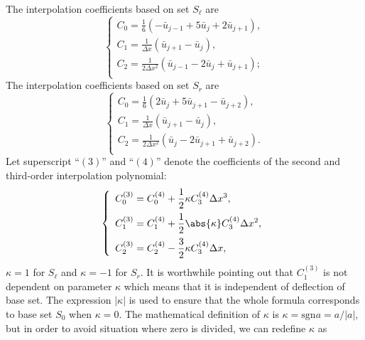 \documentclass[]{article}
\begin{document}
The interpolation coefficients based on set 
$S_\ell$ are
\begin{equation*}
    \left\{\begin{array}{l}
	\displaystyle
	C_0 = \frac{1}{6}(-\bar u_{j-1}+5\bar u_j+2\bar u_{j+1}),\\[3mm]
	\displaystyle
	C_1= \frac{1}{\Delta x}(\bar u_{j+1}-\bar u_{j}),\\[3mm]
	\displaystyle
	C_2 = \frac{1}{2\Delta x^2}(\bar u_{j-1}-2\bar u_j+\bar u_{j+1});\\[3mm]
    \end{array}\right.
\end{equation*}
The interpolation coefficients based on set $S_r$ are
\begin{equation*}
    \left\{\begin{array}{l}
	\displaystyle
	C_0 = \frac{1}{6}(2\bar u_{j}+5\bar u_{j+1}-\bar u_{j+2}),\\[3mm]
	\displaystyle
	C_1= \frac{1}{\Delta x}(\bar u_{j+1}-\bar u_{j}),\\[3mm]
	\displaystyle
	C_2 = \frac{1}{2\Delta x^2}(\bar u_{j}-2\bar u_{j+1}+\bar u_{j+2}).\\[3mm]
    \end{array}\right.
\end{equation*}
Let superscript ``$(3)$'' and ``$(4)$'' denote the coefficients of the second
and third-order interpolation polynomial:
\begin{equation}
    \left\{\begin{array}{l}
	\displaystyle
	C_0^{(3)}=C_0^{(4)}+\frac{1}{2}\kappa C_3^{(4)}\Delta x^3, \\[3mm]
	\displaystyle
	C_1^{(3)}=C_1^{(4)}+\frac{1}{2}\abs{\kappa} C_3^{(4)}\Delta x^2, \\[3mm]
	\displaystyle
	C_2^{(3)}=C_2^{(4)}-\frac{3}{2}\kappa C_3^{(4)}\Delta x, \\
    \end{array}\right.
    \label{eq:ave-C-34}
\end{equation}
$\kappa = 1$ for $S_\ell$ and $\kappa = -1$ for $S_r$. It is worthwhile pointing
out that $C_1^{(3)}$ is not dependent on parameter $\kappa$ which means that it
is independent of deflection of base set. The expression $|\kappa|$ is used to
ensure that the whole formula corresponds to base set $S_0$ when $\kappa=0$. The
mathematical definition of $\kappa$ is $\kappa = \mathrm{sgn} a = a/|a|$, but
in order to avoid situation where zero is divided, we can redefine $\kappa$ as
\end{document}
